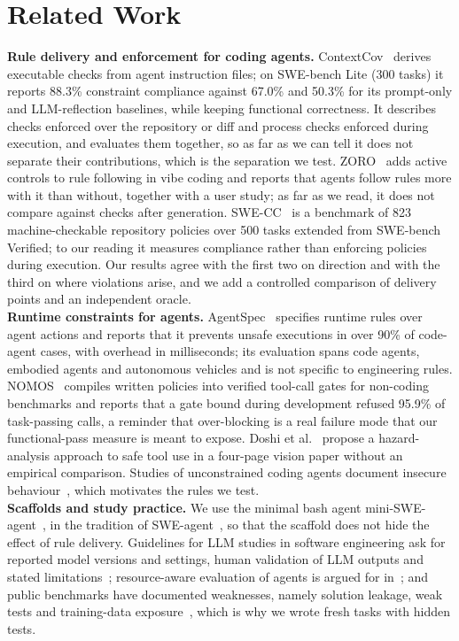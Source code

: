 \documentclass[conference]{IEEEtran}
\begin{document}
\section{Related Work}
\textbf{Rule delivery and enforcement for coding agents.}
ContextCov~\cite{contextcov} derives executable checks from agent instruction files; on SWE-bench Lite (300 tasks) it reports 88.3\% constraint compliance against 67.0\% and 50.3\% for its prompt-only and LLM-reflection baselines, while keeping functional correctness.
It describes checks enforced over the repository or diff and process checks enforced during execution, and evaluates them together, so as far as we can tell it does not separate their contributions, which is the separation we test.
ZORO~\cite{zoro} adds active controls to rule following in vibe coding and reports that agents follow rules more with it than without, together with a user study; as far as we read, it does not compare against checks after generation.
SWE-CC~\cite{swecc} is a benchmark of 823 machine-checkable repository policies over 500 tasks extended from SWE-bench Verified; to our reading it measures compliance rather than enforcing policies during execution.
Our results agree with the first two on direction and with the third on where violations arise, and we add a controlled comparison of delivery points and an independent oracle.\\
\textbf{Runtime constraints for agents.}
AgentSpec~\cite{agentspec} specifies runtime rules over agent actions and reports that it prevents unsafe executions in over 90\% of code-agent cases, with overhead in milliseconds; its evaluation spans code agents, embodied agents and autonomous vehicles and is not specific to engineering rules.
NOMOS~\cite{nomos} compiles written policies into verified tool-call gates for non-coding benchmarks and reports that a gate bound during development refused 95.9\% of task-passing calls, a reminder that over-blocking is a real failure mode that our functional-pass measure is meant to expose.
Doshi et al.~\cite{doshi2026} propose a hazard-analysis approach to safe tool use in a four-page vision paper without an empirical comparison.
Studies of unconstrained coding agents document insecure behaviour~\cite{securitydebt}, which motivates the rules we test.\\
\textbf{Scaffolds and study practice.}
We use the minimal bash agent mini-SWE-agent~\cite{miniswe}, in the tradition of SWE-agent~\cite{sweagent}, so that the scaffold does not hide the effect of rule delivery.
Guidelines for LLM studies in software engineering ask for reported model versions and settings, human validation of LLM outputs and stated limitations~\cite{baltes}; resource-aware evaluation of agents is argued for in~\cite{sweeffi}; and public benchmarks have documented weaknesses, namely solution leakage, weak tests and training-data exposure~\cite{swebenchplus}, which is why we wrote fresh tasks with hidden tests.\\
\end{document}
